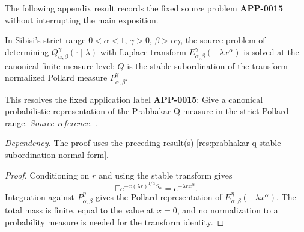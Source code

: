 The following appendix result records the fixed source problem \textbf{APP-0015} \cite{sibisi-prabhakar} without interrupting the main exposition.
\begin{corollary}
\label{res:sibisi-prabhakar-q-measure-problem-solved-canonical}
In Sibisi's strict range \(0<\alpha<1\), \(\gamma>0\), \(\beta>\alpha\gamma\), the source problem of determining \(Q^\gamma_{\alpha,\beta}(\cdot\mid\lambda)\) with Laplace transform \(E^\gamma_{\alpha,\beta}(-\lambda x^\alpha)\) is solved at the canonical finite-measure level: \(Q\) is the stable subordination of the transform-normalized Pollard measure \(P^\gamma_{\alpha,\beta}\).

This resolves the fixed application label \textbf{APP-0015}: Give a canonical probabilistic representation of the Prabhakar Q-measure in the strict Pollard range.
\emph{Source reference.} \cite{sibisi-prabhakar}.

\emph{Dependency.} The proof uses the preceding result(s) \ref{res:prabhakar-q-stable-subordination-normal-form}.
\end{corollary}
\begin{proof}
Conditioning on \(r\) and using the stable transform gives
\[
 \mathbb E e^{-x(\lambda r)^{1/\alpha}S_\alpha}=e^{-\lambda r x^\alpha}.
\]
Integration against \(P_{\alpha,\beta}^{\eta}\) gives the Pollard
representation of \(E_{\alpha,\beta}^{\eta}(-\lambda x^\alpha)\).  The total
mass is finite, equal to the value at \(x=0\), and no normalization to a
probability measure is needed for the transform identity.
\end{proof}
